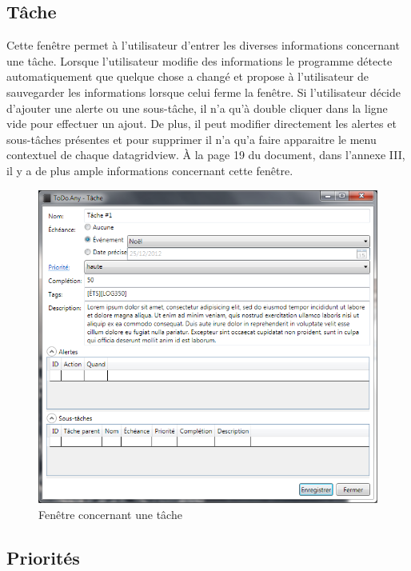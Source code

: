 \documentclass[letterpaper, oneside, 12pt, these, creativecommons]{thETS}
\begin{document}
\newpage

\subsection{Tâche}

Cette fenêtre permet à l'utilisateur d'entrer les diverses informations concernant une tâche. Lorsque l'utilisateur modifie des informations le programme détecte automatiquement que quelque chose a changé et propose à l'utilisateur de sauvegarder les informations lorsque celui ferme la fenêtre. Si l'utilisateur décide d'ajouter une alerte ou une sous-tâche, il n'a qu'à double cliquer dans la ligne vide pour effectuer un ajout. De plus, il peut modifier directement les alertes et sous-tâches présentes et pour supprimer il n'a qu'a faire apparaitre le menu contextuel de chaque datagridview. À la page 19 du document, dans l'annexe III, il y a de plus ample informations concernant cette fenêtre.

\begin{figure}[H!]
	\centering
	\includegraphics[width=1\textwidth]{fenetre_tache.png}
	\caption{Fenêtre concernant une tâche}
\end{figure}

\newpage

\subsection{Priorités}
\end{document}
